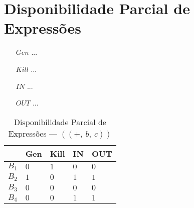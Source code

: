 \section{Disponibilidade Parcial de Express\~oes}

\begin{itemize}
  \item[$Gen$] ...
  \item[$Kill$] ...
  \item[$IN$] ...
  \item[$OUT$] ...
\end{itemize}

\begin{table}[ht]
\centering
\begin{tabular}{l|l|l|l|l}
	& Gen & Kill & IN & OUT\\
\hline
$B_{1}$ &  $0$ & $1$ & $0$ & $0$\\
$B_{2}$ &  $1$ & $0$ & $1$ & $1$\\
$B_{3}$ &  $0$ & $0$ & $0$ & $0$\\
$B_{4}$ &  $0$ & $0$ & $1$ & $1$\\
\end{tabular}
\caption{Disponibilidade Parcial de Express\~oes --- $((+,\:b,\:c))$}
\end{table}

